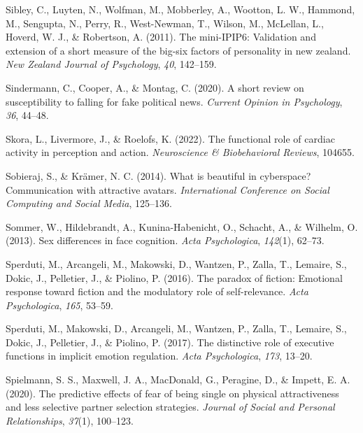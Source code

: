 \documentclass[
  man,
  floatsintext,
  longtable,
  nolmodern,
  notxfonts,
  notimes,
  colorlinks=true,linkcolor=blue,citecolor=blue,urlcolor=blue]{apa7}
\newlength{\cslhangindent}
\newenvironment{CSLReferences}[2] %
 {\begin{list}{}{%
  \setlength{\itemindent}{0pt}
  \setlength{\leftmargin}{0pt}
  \setlength{\parsep}{0pt}
  \ifodd #1
   \setlength{\leftmargin}{\cslhangindent}
   \setlength{\itemindent}{-1\cslhangindent}
  \fi
  \setlength{\itemsep}{#2\baselineskip}}}
 {\end{list}}
\begin{document}
\begin{CSLReferences}{1}{0}
Sibley, C., Luyten, N., Wolfman, M., Mobberley, A., Wootton, L. W.,
Hammond, M., Sengupta, N., Perry, R., West-Newman, T., Wilson, M.,
McLellan, L., Hoverd, W. J., \& Robertson, A. (2011). The mini-IPIP6:
Validation and extension of a short measure of the big-six factors of
personality in new zealand. \emph{New Zealand Journal of Psychology},
\emph{40}, 142--159.

Sindermann, C., Cooper, A., \& Montag, C. (2020). A short review on
susceptibility to falling for fake political news. \emph{Current Opinion
in Psychology}, \emph{36}, 44--48.

Skora, L., Livermore, J., \& Roelofs, K. (2022). The functional role of
cardiac activity in perception and action. \emph{Neuroscience \&
Biobehavioral Reviews}, 104655.

Sobieraj, S., \& Krämer, N. C. (2014). What is beautiful in cyberspace?
Communication with attractive avatars. \emph{International Conference on
Social Computing and Social Media}, 125--136.

Sommer, W., Hildebrandt, A., Kunina-Habenicht, O., Schacht, A., \&
Wilhelm, O. (2013). Sex differences in face cognition. \emph{Acta
Psychologica}, \emph{142}(1), 62--73.

Sperduti, M., Arcangeli, M., Makowski, D., Wantzen, P., Zalla, T.,
Lemaire, S., Dokic, J., Pelletier, J., \& Piolino, P. (2016). The
paradox of fiction: Emotional response toward fiction and the modulatory
role of self-relevance. \emph{Acta Psychologica}, \emph{165}, 53--59.

Sperduti, M., Makowski, D., Arcangeli, M., Wantzen, P., Zalla, T.,
Lemaire, S., Dokic, J., Pelletier, J., \& Piolino, P. (2017). The
distinctive role of executive functions in implicit emotion regulation.
\emph{Acta Psychologica}, \emph{173}, 13--20.

Spielmann, S. S., Maxwell, J. A., MacDonald, G., Peragine, D., \&
Impett, E. A. (2020). The predictive effects of fear of being single on
physical attractiveness and less selective partner selection strategies.
\emph{Journal of Social and Personal Relationships}, \emph{37}(1),
100--123.


\end{CSLReferences}
\end{document}
